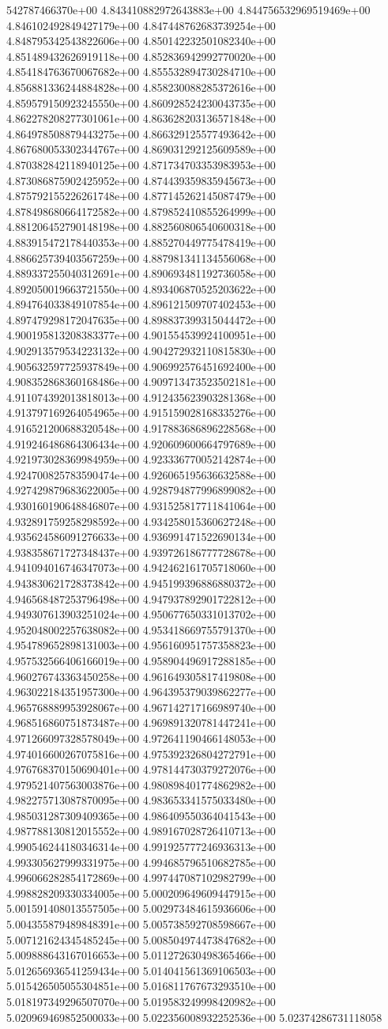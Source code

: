542787466370e+00	4.843410882972643883e+00	4.844756532969519469e+00	4.846102492849427179e+00	4.847448762683739254e+00	4.848795342543822606e+00	4.850142232501082340e+00	4.851489432626919118e+00	4.852836942992770020e+00	4.854184763670067682e+00	4.855532894730284710e+00	4.856881336244884828e+00	4.858230088285372616e+00	4.859579150923245550e+00	4.860928524230043735e+00	4.862278208277301061e+00	4.863628203136571848e+00	4.864978508879443275e+00	4.866329125577493642e+00	4.867680053302344767e+00	4.869031292125609589e+00	4.870382842118940125e+00	4.871734703353983953e+00	4.873086875902425952e+00	4.874439359835945673e+00	4.875792155226261748e+00	4.877145262145087479e+00	4.878498680664172582e+00	4.879852410855264999e+00	4.881206452790148198e+00	4.882560806540600318e+00	4.883915472178440353e+00	4.885270449775478419e+00	4.886625739403567259e+00	4.887981341134556068e+00	4.889337255040312691e+00	4.890693481192736058e+00	4.892050019663721550e+00	4.893406870525203622e+00	4.894764033849107854e+00	4.896121509707402453e+00	4.897479298172047635e+00	4.898837399315044472e+00	4.900195813208383377e+00	4.901554539924100951e+00	4.902913579534223132e+00	4.904272932110815830e+00	4.905632597725937849e+00	4.906992576451692400e+00	4.908352868360168486e+00	4.909713473523502181e+00	4.911074392013818013e+00	4.912435623903281368e+00	4.913797169264054965e+00	4.915159028168335276e+00	4.916521200688320548e+00	4.917883686896228568e+00	4.919246486864306434e+00	4.920609600664797689e+00	4.921973028369984959e+00	4.923336770052142874e+00	4.924700825783590474e+00	4.926065195636632588e+00	4.927429879683622005e+00	4.928794877996899082e+00	4.930160190648846807e+00	4.931525817711841064e+00	4.932891759258298592e+00	4.934258015360627248e+00	4.935624586091276633e+00	4.936991471522690134e+00	4.938358671727348437e+00	4.939726186777728678e+00	4.941094016746347073e+00	4.942462161705718060e+00	4.943830621728373842e+00	4.945199396886880372e+00	4.946568487253796498e+00	4.947937892901722812e+00	4.949307613903251024e+00	4.950677650331013702e+00	4.952048002257638082e+00	4.953418669755791370e+00	4.954789652898131003e+00	4.956160951757358823e+00	4.957532566406166019e+00	4.958904496917288185e+00	4.960276743363450258e+00	4.961649305817419808e+00	4.963022184351957300e+00	4.964395379039862277e+00	4.965768889953928067e+00	4.967142717166989740e+00	4.968516860751873487e+00	4.969891320781447241e+00	4.971266097328578049e+00	4.972641190466148053e+00	4.974016600267075816e+00	4.975392326804272791e+00	4.976768370150690401e+00	4.978144730379272076e+00	4.979521407563003876e+00	4.980898401774862982e+00	4.982275713087870095e+00	4.983653341575033480e+00	4.985031287309409365e+00	4.986409550364041543e+00	4.987788130812015552e+00	4.989167028726410713e+00	4.990546244180346314e+00	4.991925777246936313e+00	4.993305627999331975e+00	4.994685796510682785e+00	4.996066282854172869e+00	4.997447087102982799e+00	4.998828209330334005e+00	5.000209649609447915e+00	5.001591408013557505e+00	5.002973484615936606e+00	5.004355879489848391e+00	5.005738592708598667e+00	5.007121624345485245e+00	5.008504974473847682e+00	5.009888643167016653e+00	5.011272630498365466e+00	5.012656936541259434e+00	5.014041561369106503e+00	5.015426505055304851e+00	5.016811767673293510e+00	5.018197349296507070e+00	5.019583249998420982e+00	5.020969469852500033e+00	5.022356008932252536e+00	5.02374286731118058